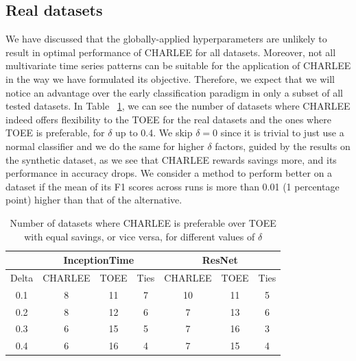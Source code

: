 \documentclass[conference]{IEEEtran}
\begin{document}
\subsection{Real datasets}

We have discussed that the globally-applied hyperparameters are unlikely to result in optimal performance of CHARLEE for all datasets. Moreover, not all multivariate time series patterns can be suitable for the application of CHARLEE in the way we have formulated its objective. Therefore, we expect that we will notice an advantage over the early classification paradigm in only a subset of all tested datasets. In Table ~\ref{table:winslosses}, we can see the number of datasets where CHARLEE indeed offers flexibility to the TOEE for the real datasets and the ones where TOEE is preferable, for $\delta$ up to 0.4. We skip $\delta=0$ since it is trivial to just use a normal classifier and we do the same for higher $\delta$ factors, guided by the results on the synthetic dataset, as we see that CHARLEE rewards savings more, and its performance in accuracy drops. We consider a method to perform better on a dataset if the mean of its F1 scores across runs is more than 0.01 (1 percentage point) higher than that of the alternative.
\begin{table}[tp]
\caption{Number of datasets where CHARLEE is preferable over TOEE with equal savings, or vice versa, for different values of $\delta$}\label{table:winslosses}
\begin{center}
\begin{tabular}{|c|ccc|ccc|}
\hline
      & \multicolumn{3}{c|}{InceptionTime}                   & \multicolumn{3}{c|}{ResNet}                           \\ \hline
Delta & \multicolumn{1}{c|}{CHARLEE} & \multicolumn{1}{c|}{TOEE}  & Ties & \multicolumn{1}{c|}{CHARLEE}  & \multicolumn{1}{c|}{TOEE}  & Ties \\ \hline
0.1   & \multicolumn{1}{c|}{8} & \multicolumn{1}{c|}{11} & 7 & \multicolumn{1}{c|}{10} & \multicolumn{1}{c|}{11} & 5 \\ \hline
0.2   & \multicolumn{1}{c|}{8} & \multicolumn{1}{c|}{12} & 6 & \multicolumn{1}{c|}{7}  & \multicolumn{1}{c|}{13} & 6 \\ \hline
0.3   & \multicolumn{1}{c|}{6} & \multicolumn{1}{c|}{15} & 5 & \multicolumn{1}{c|}{7}  & \multicolumn{1}{c|}{16} & 3 \\ \hline
0.4   & \multicolumn{1}{c|}{6} & \multicolumn{1}{c|}{16} & 4 & \multicolumn{1}{c|}{7}  & \multicolumn{1}{c|}{15} & 4 \\ \hline
\end{tabular}
\end{center}
\end{table}
\end{document}
